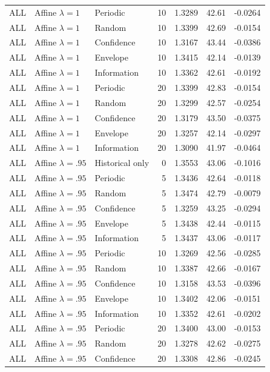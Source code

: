\begin{longtable}{lllrrrr}
ALL & Affine $\lambda=1$ & Periodic & 10 & 1.3289 & 42.61 & -0.0264 \\
ALL & Affine $\lambda=1$ & Random & 10 & 1.3399 & 42.69 & -0.0154 \\
ALL & Affine $\lambda=1$ & Confidence & 10 & 1.3167 & 43.44 & -0.0386 \\
ALL & Affine $\lambda=1$ & Envelope & 10 & 1.3415 & 42.14 & -0.0139 \\
ALL & Affine $\lambda=1$ & Information & 10 & 1.3362 & 42.61 & -0.0192 \\
ALL & Affine $\lambda=1$ & Periodic & 20 & 1.3399 & 42.83 & -0.0154 \\
ALL & Affine $\lambda=1$ & Random & 20 & 1.3299 & 42.57 & -0.0254 \\
ALL & Affine $\lambda=1$ & Confidence & 20 & 1.3179 & 43.50 & -0.0375 \\
ALL & Affine $\lambda=1$ & Envelope & 20 & 1.3257 & 42.14 & -0.0297 \\
ALL & Affine $\lambda=1$ & Information & 20 & 1.3090 & 41.97 & -0.0464 \\
ALL & Affine $\lambda=.95$ & Historical only & 0 & 1.3553 & 43.06 & -0.1016 \\
ALL & Affine $\lambda=.95$ & Periodic & 5 & 1.3436 & 42.64 & -0.0118 \\
ALL & Affine $\lambda=.95$ & Random & 5 & 1.3474 & 42.79 & -0.0079 \\
ALL & Affine $\lambda=.95$ & Confidence & 5 & 1.3259 & 43.25 & -0.0294 \\
ALL & Affine $\lambda=.95$ & Envelope & 5 & 1.3438 & 42.44 & -0.0115 \\
ALL & Affine $\lambda=.95$ & Information & 5 & 1.3437 & 43.06 & -0.0117 \\
ALL & Affine $\lambda=.95$ & Periodic & 10 & 1.3269 & 42.56 & -0.0285 \\
ALL & Affine $\lambda=.95$ & Random & 10 & 1.3387 & 42.66 & -0.0167 \\
ALL & Affine $\lambda=.95$ & Confidence & 10 & 1.3158 & 43.53 & -0.0396 \\
ALL & Affine $\lambda=.95$ & Envelope & 10 & 1.3402 & 42.06 & -0.0151 \\
ALL & Affine $\lambda=.95$ & Information & 10 & 1.3352 & 42.61 & -0.0202 \\
ALL & Affine $\lambda=.95$ & Periodic & 20 & 1.3400 & 43.00 & -0.0153 \\
ALL & Affine $\lambda=.95$ & Random & 20 & 1.3278 & 42.62 & -0.0275 \\
ALL & Affine $\lambda=.95$ & Confidence & 20 & 1.3308 & 42.86 & -0.0245 \\

\end{longtable}
